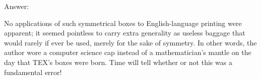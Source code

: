 Answer:

No applications of such symmetrical boxes to English-language printing were
apparent; it seemed pointless to carry extra generality as useless baggage that would
rarely if ever be used, merely for the sake of symmetry. In other words, the author
wore a computer science cap instead of a mathematician’s mantle on the day that TEX’s
boxes were born. Time will tell whether or not this was a fundamental error!

\bye
